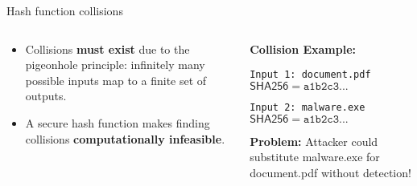 \documentclass[aspectratio=169, lualatex, handout]{beamer}
\begin{document}
\begin{frame}{Hash function collisions}
	\begin{columns}[c]
		\begin{column}{0.55\textwidth}
			\begin{itemize}[<+->]
				\item Collisions \textbf{must exist} due to the pigeonhole principle:
				      infinitely many possible inputs map to a finite set of outputs.
				\item A secure hash function makes finding collisions \textbf{computationally infeasible}.
			\end{itemize}
		\end{column}
		\begin{column}{0.45\textwidth}
			\begin{tcolorbox}[colback=black!5!white,colframe=ciphergray]
				\textbf{Collision Example:}

				\vspace{0.2cm}

				\texttt{Input 1: document.pdf}\\
				$\mathsf{SHA256} = \texttt{a1b2c3...}$

				\vspace{0.2cm}

				\texttt{Input 2: malware.exe}\\
				$\mathsf{SHA256} = \texttt{a1b2c3...}$

				\vspace{0.2cm}

				\textcolor{cipherprimary}{\textbf{Problem:} \small Attacker could substitute malware.exe for document.pdf without detection!}
			\end{tcolorbox}
		\end{column}
	\end{columns}
\end{frame}
\end{document}
